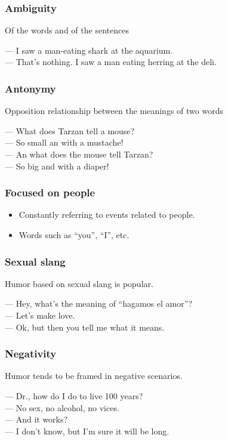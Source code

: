 \begin{frame}
    \frametitle{Ambiguity}

    Of the words and of the sentences

    \begin{example}
        --- I saw a man-eating shark at the aquarium. \\
        --- That’s nothing. I saw a man eating herring at the deli.
    \end{example}
\end{frame}

\begin{frame}
    \frametitle{Antonymy}

    Opposition relationship between the meanings of two words

    \begin{example}
        --- What does Tarzan tell a mouse? \\
        --- So small an with a mustache! \\
        --- An what does the mouse tell Tarzan? \\
        --- So big and with a diaper! \\
    \end{example}
\end{frame}

\begin{frame}
    \frametitle{Focused on people}

    \begin{itemize}
        \item Constantly referring to events related to people.

        \item Words such as ``you'', ``I'', etc.
    \end{itemize}
\end{frame}

\begin{frame}
    \frametitle{Sexual slang}

    Humor based on sexual slang is popular.

    \begin{example}
        --- Hey, what's the meaning of ``hagamos el amor''? \\
        --- Let's make love. \\
        --- Ok, but then you tell me what it means.
    \end{example}
\end{frame}

\begin{frame}
    \frametitle{Negativity}

    Humor tends to be framed in negative scenarios.

    \begin{example}
        --- Dr., how do I do to live 100 years? \\
        --- No sex, no alcohol, no vices. \\
        --- And it works? \\
        --- I don't know, but I'm sure it will be long.
    \end{example}
\end{frame}

